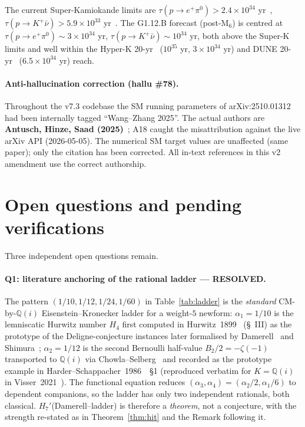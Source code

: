 \documentclass[a4paper,11pt]{article}
\newcommand{\Qi}{\mathbb{Q}(i)}
\theoremstyle{definition}
\theoremstyle{remark}
\begin{document}
The current Super-Kamiokande limits are
$\tau(p\to e^+\pi^0)>2.4\times 10^{34}$ yr~\cite{SuperK20epi},
$\tau(p\to K^+\bar\nu)>5.9\times 10^{33}$ yr~\cite{SuperK14Knu}.  The
G1.12.B forecast (post-M$_6$) is centred at
$\tau(p\to e^+\pi^0)\sim 3\times 10^{34}$ yr,
$\tau(p\to K^+\bar\nu)\sim 10^{34}$ yr, both above the Super-K limits
and well within the Hyper-K 20-yr~\cite{HK18} ($10^{35}$ yr,
$3\times 10^{34}$ yr) and DUNE 20-yr~\cite{DUNE24} ($6.5\times 10^{34}$
yr) reach.

\paragraph{Anti-hallucination correction (hallu \#78).}
Throughout the v7.3 codebase the SM running parameters of
arXiv:2510.01312 had been internally tagged ``Wang--Zhang 2025''.
The actual authors are \textbf{Antusch, Hinze, Saad
(2025)}~\cite{AHS25}; A18 caught the misattribution against the live
arXiv API (2026-05-05).  The numerical SM target values are
unaffected (same paper); only the citation has been corrected.  All
in-text references in this v2 amendment use the correct authorship.

\section{Open questions and pending verifications}
\label{sec:open}

Three independent open questions remain.

\paragraph{Q1: literature anchoring of the rational ladder ---
\textbf{RESOLVED}.}
The pattern $(1/10,1/12,1/24,1/60)$ in Table~\ref{tab:ladder} is the
\emph{standard} CM-by-$\Qi$ Eisenstein--Kronecker ladder for a
weight-$5$ newform: $\alpha_1 = 1/10$ is the lemniscatic Hurwitz
number $H_4$ first computed in Hurwitz~1899~\cite{Hurwitz1899}
(\S~III) as the prototype of the Deligne-conjecture instances later
formalised by Damerell~\cite{Damerell71} and
Shimura~\cite{Shimura76}; $\alpha_2 = 1/12$ is the second Bernoulli
half-value $B_2/2 = -\zeta(-1)$ transported to $\Qi$ via
Chowla--Selberg~\cite{ChowSel49} and recorded as the
prototype example in Harder--Schappacher~1986~\cite{HS86}~\S 1
(reproduced verbatim for $K=\Qi$ in Visser~2021~\cite{Visser21}).
The functional equation reduces $(\alpha_3,\alpha_4) = (\alpha_2/2,
\alpha_1/6)$ to dependent companions, so the ladder has only two
independent rationals, both classical.  $H_7'$(Damerell--ladder) is
therefore a \emph{theorem}, not a conjecture, with the strength
re-stated as in Theorem~\ref{thm:hit} and the Remark following it.
\end{document}
